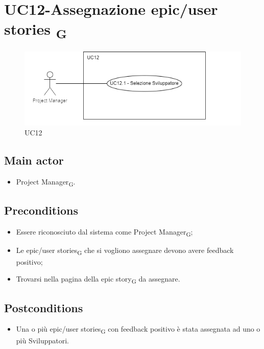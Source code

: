 \documentclass{article}
\begin{document}
\section{UC12-Assegnazione epic/user stories \textsubscript{G}}
    \begin{figure}[h]
      \centering
      \includegraphics{./imgUML/UC12.png}
    \caption{UC12}
      \label{fig:UC12}
    \end{figure}

    \subsection*{Main actor}
    \begin{itemize}
        \item Project Manager\textsubscript{G}.
    \end{itemize}
    
    \subsection*{Preconditions}
        \begin{itemize}
            \item Essere riconosciuto dal sistema come Project Manager\textsubscript{G};
            \item Le epic/user stories\textsubscript{G} che si vogliono assegnare devono avere feedback positivo;
            \item Trovarsi nella pagina della epic story\textsubscript{G} da assegnare.
        \end{itemize}
        
    \subsection*{Postconditions}
        \begin{itemize}
            \item Una o più epic/user stories\textsubscript{G} con feedback positivo è stata assegnata ad uno o più Sviluppatori.
        \end{itemize}
    
\end{document}
